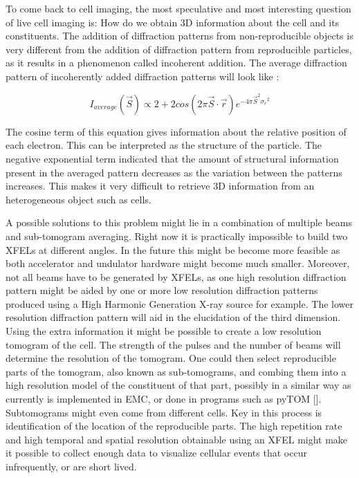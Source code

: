 To come back to cell imaging, the most speculative and most interesting question of live cell imaging is: How do we obtain 3D information about the cell and its constituents. The addition of diffraction patterns from non-reproducible objects is very different from the addition of diffraction pattern from reproducible particles, as it results in a phenomenon called incoherent addition. The average diffraction pattern of incoherently added diffraction patterns will look like \cite{Maia2009}:

\begin{equation}
I_{average}(\vec{S}) \propto 2 + 2 cos(2\pi \vec{S} \cdot \vec{r}) e^{-4\pi\vec{S}^2{\sigma_r}^2}
\end{equation}

The cosine term of this equation gives information about the relative position of each electron. This can be interpreted as the structure of the particle. The negative exponential term indicated that the amount of structural information present in the averaged pattern decreases as the variation between the patterns increases. This makes it very difficult to retrieve 3D information from an heterogeneous object such as cells. 

A possible solutions to this problem might lie in a combination of multiple beams and sub-tomogram averaging. Right now it is practically impossible to build two XFELs at different angles. In the future this might be become more feasible as both accelerator and undulator hardware might become much smaller. Moreover, not all beams have to be generated by XFELs, as one high resolution diffraction pattern might be aided by one or more low resolution diffraction patterns produced using a High Harmonic Generation X-ray source for example. The lower resolution diffraction pattern will aid in the elucidation of the third dimension. Using the extra information it might be possible to create a low resolution tomogram of the cell. The strength of the pulses and the number of beams will determine the resolution of the tomogram. One could then select reproducible parts of the tomogram, also known as sub-tomograms, and combing them into a high resolution model of the constituent of that part, possibly in a similar way as currently is implemented in EMC, or done in programs such as pyTOM []. Subtomograms might even come from different cells. Key in this process is identification of the location of the reproducible parts. The high repetition rate and high temporal and spatial resolution obtainable using an XFEL might make it possible to collect enough data to visualize cellular events that occur infrequently, or are short lived. 

